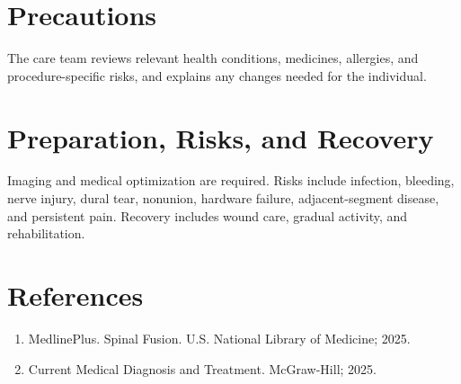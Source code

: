 \section*{Precautions}
The care team reviews relevant health conditions, medicines, allergies, and procedure-specific risks, and explains any changes needed for the individual.

\section*{Preparation, Risks, and Recovery}
Imaging and medical optimization are required. Risks include infection, bleeding, nerve injury, dural tear, nonunion, hardware failure, adjacent-segment disease, and persistent pain. Recovery includes wound care, gradual activity, and rehabilitation.

\section*{References}
\begin{enumerate}
  \item MedlinePlus. Spinal Fusion. U.S. National Library of Medicine; 2025.
  \item Current Medical Diagnosis and Treatment. McGraw-Hill; 2025.
\end{enumerate}
\clearpage
